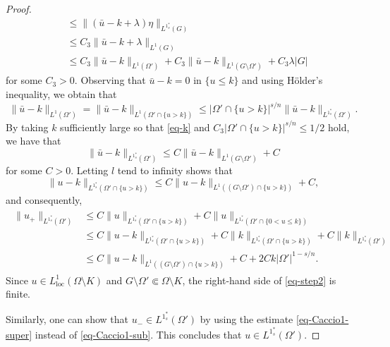 \documentclass[10pt,a4paper]{amsart}
\begin{document}
\begin{proof}
\begin{align*}
&\leq \|(\bar{u}-k+\lambda)\eta\|_{L^{1^{\ast}_s}(G)} \\
&\leq C_3 \|\bar{u}-k+\lambda\|_{L^1(G)} \\
&\leq C_3 \|\bar{u}-k\|_{L^1(\Omega')} + C_3 \|\bar{u}-k\|_{L^1(G\setminus \Omega')} + C_3 \lambda |G|
\end{align*}
for some $C_3>0$. Observing that $\bar{u}-k=0$ in $\{u \leq k\}$ and using H\"older's inequality, we obtain that
\begin{equation*}
\|\bar{u}-k\|_{L^1(\Omega')} = \|\bar{u}-k\|_{L^1(\Omega' \cap \{u > k\})} \leq |\Omega' \cap \{u>k\}|^{s/n} \|\bar{u}-k\|_{L^{1^{\ast}_s}(\Omega')}.
\end{equation*}
By taking $k$ sufficiently large so that \eqref{eq-k} and $C_3 |\Omega' \cap \{u>k\}|^{s/n} \leq 1/2$ hold, we have that
\begin{equation*}
\|\bar{u}-k\|_{L^{1^{\ast}_s}(\Omega')} \leq C \|\bar{u}-k\|_{L^1(G\setminus \Omega')} + C
\end{equation*}
for some $C>0$. Letting $l$ tend to infinity shows that
\begin{equation*}
\|u-k\|_{L^{1^{\ast}_s}(\Omega' \cap \{u>k\})} \leq C \|u-k\|_{L^1((G\setminus \Omega')\cap \{u>k\})} + C,
\end{equation*}
and consequently,
\begin{align}\label{eq-step2}
\begin{split}
\|u_+\|_{L^{1^{\ast}_s}(\Omega')}
&\leq C \|u\|_{L^{1^{\ast}_s}(\Omega' \cap \{u>k\})} + C \|u\|_{L^{1^{\ast}_s}(\Omega' \cap \{0<u\leq k\})} \\
&\leq C \|u-k\|_{L^{1^{\ast}_s}(\Omega' \cap \{u>k\})} + C \|k\|_{L^{1^{\ast}_s}(\Omega' \cap \{u>k\})} + C \|k\|_{L^{1^{\ast}_s}(\Omega')} \\
&\leq C \|u-k\|_{L^1((G\setminus \Omega')\cap \{u>k\})} + C + 2Ck|\Omega'|^{1-s/n}.
\end{split}
\end{align}
Since $u \in L^1_{\mathrm{loc}}(\Omega \setminus K)$ and $G \setminus \Omega' \Subset \Omega \setminus K$, the right-hand side of \eqref{eq-step2} is finite.

Similarly, one can show that $u_- \in L^{1^{\ast}_s}(\Omega')$ by using the estimate \eqref{eq-Caccio1-super} instead of \eqref{eq-Caccio1-sub}. This concludes that $u \in L^{1^{\ast}_s}(\Omega')$.
\end{proof}
\end{document}
